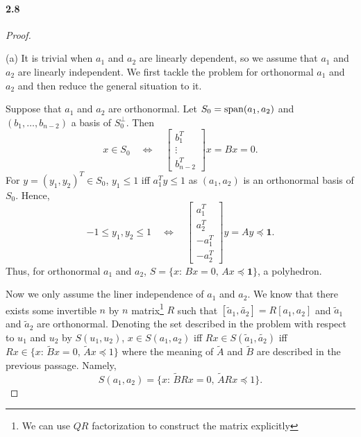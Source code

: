 \paragraph{2.8}
\begin{proof}
  $\,$\par
  (a) It is trivial when $a_1$ and $a_2$ are linearly dependent, so we assume 
  that $a_1$ and $a_2$ are linearly independent. We first tackle the problem for
  orthonormal $a_1$ and $a_2$ and then reduce the general situation to it.\par
  Suppose that $a_1$ and $a_2$ are orthonormal. Let $S_0=\operatorname{span}(a_1,a_2)$ and 
  $(b_1,\dots,b_{n-2})$ a basis of $S_0^\perp$. Then
  \[
    x\in S_0 \quad\Leftrightarrow\quad
    \begin{bmatrix}
      b_1^T \\ \vdots \\ b_{n-2}^T 
    \end{bmatrix}x = Bx = 0.
  \]
  For $y=(y_1,y_2)^T\in S_0$, $y_1\le 1$ iff $a_1^Ty \le 1$ as $(a_1,a_2)$ is an
  orthonormal basis of $S_0$. Hence, 
  \[
    -1\le y_1,y_2\le 1 \quad\Leftrightarrow\quad
    \begin{bmatrix}
      a_1^T \\ a_2^T \\ -a_1^T \\ -a_2^T
    \end{bmatrix}y = Ay \preceq \mathbf{1}.
  \]
  Thus, for orthonormal $a_1$ and $a_2$, $S=\{x:\, Bx=0,\, Ax\preceq\mathbf{1}\}
  $, a polyhedron.\par
  Now we only assume the liner independence of $a_1$ and $a_2$. We know that
  there exists some invertible $n$ by $n$ matrix\footnote{We can use $QR$ 
  factorization to construct the matrix explicitly} $R$ such that $[\tilde{a}_1,
  \tilde{a_2}]=R[a_1,a_2]$ and $\tilde{a}_1$ and $\tilde{a}_2$ are orthonormal. 
  Denoting the set described in the problem with respect to $u_1$ and $u_2$ by
  $S(u_1,u_2)$, $x\in S(a_1,a_2)$ iff $Rx\in S(\tilde{a}_1,\tilde{a_2})$ iff
  $Rx \in \{x:\,\tilde{B}x=0,\, \tilde{A}x\preceq 1\}$ where the meaning of 
  $\tilde{A}$ and $\tilde{B}$ are described in the previous passage. Namely, 
  \[
    S(a_1,a_2) = \{x:\, \tilde{B}Rx=0,\, \tilde{A}Rx\preceq 1\}.
  \]
  

\end{proof}
